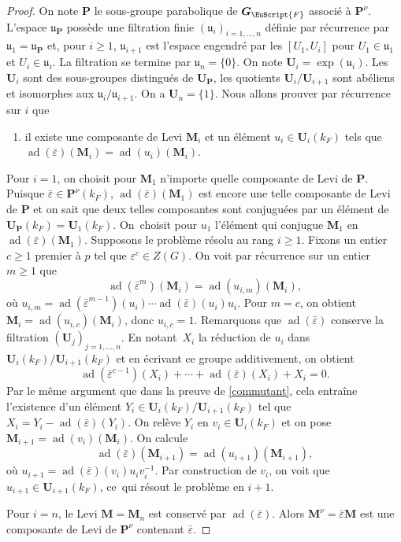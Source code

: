 \documentclass[JEP,XML,SOM,Unicode,francais]{cedram}
\let\mathcal \EuScript
\let\epsilon\varepsilon
\newcommand{\fru}{\mathfrak{u}}
\DeclareMathOperator{\ad}{ad}
\newcommand{\bG}{\boldsymbol{G}}
\newcommand{\bM}{\boldsymbol{M}}
\newcommand{\bP}{\boldsymbol{P}}
\newcommand{\bU}{\boldsymbol{U}}
\newcommand{\cF}{\mathcal{F}}
\theoremstyle{plain}
\theoremstyle{definition}
\begin{document}
\begin{proof}
On note $\bP$ le sous-groupe parabolique de $\bG_{\cF}$ associé à $\bP^{\nu}$. L'espace $\boldsymbol{\fru}_{\bP}$ possède une filtration finie $(\boldsymbol{\fru}_{i})_{i=1,\dots,n}$ définie par récurrence par $\boldsymbol{\fru}_{1}=\boldsymbol{\fru}_{\bP}$ et, pour $i\geq1$, $\boldsymbol{\fru}_{i+1}$ est l'espace engendré par les $[U_{1},U_{i}]$ pour $U_{1}\in \boldsymbol{\fru}_{1}$ et $U_{i}\in \boldsymbol{\fru}_{i}$. La filtration se termine par $\boldsymbol{\fru}_{n}=\{0\}$. On note $\bU_{i}=\exp(\boldsymbol{\fru}_{i})$. Les $\bU_{i}$ sont des sous-groupes distingués de $\bU_{\bP}$, les quotients $\bU_{i}/\bU_{i+1}$ sont abéliens et isomorphes aux $\boldsymbol{\fru}_{i}/\boldsymbol{\fru}_{i+1}$. On a $\bU_{n}=\{1\}$. Nous allons prouver par récurrence sur $i$ que
\begin{enumerate}
\item\label{p'unlemme1}
il existe une composante de Levi $\bM_{i}$ et un élément $u_{i}\in \bU_{i}(k_{F})$ tels que $\ad(\bar{\epsilon})(\bM_{i})=\ad(u_{i})(\bM_{i})$.
\end{enumerate}

Pour $i=1$, on choisit pour $\bM_{1}$ n'importe quelle composante de Levi de $\bP$. Puisque $\bar{\epsilon}\in \bP^{\nu}(k_{F})$, $\ad(\bar{\epsilon})(\bM_{1})$ est encore une telle composante de Levi de $\bP$ et on sait que deux telles composantes sont conjuguées par un élément de $\bU_{\bP}(k_{F})=\bU_{1}(k_{F})$. On~choisit pour $u_{1}$ l'élément qui conjugue $\bM_{1}$ en $\ad(\bar{\epsilon})(\bM_{1})$. Supposons le problème résolu au rang $i\geq1$.
Fixons un entier $c\geq1$ premier à $p$ tel que $\epsilon^c\in Z(G)$. On voit par récurrence sur un entier $m\geq1$ que
\[
\ad(\bar{\epsilon}^m)(\bM_{i})=\ad( u_{i,m})(\bM_{i}),
\]
où $u_{i,m}=\ad(\bar{\epsilon}^{m-1})(u_{i})\cdots\ad(\bar{\epsilon})(u_{i})u_{i}$. Pour $m=c$, on obtient $\bM_{i}=\ad(u_{i,c})(\bM_{i})$, donc $u_{i,c}=1$. Remarquons que $\ad(\bar{\epsilon})$ conserve la filtration $(\bU_{j})_{j=1,\dots,n}$. En notant~$X_{i}$ la réduction de $u_{i}$ dans $\bU_{i}(k_{F})/\bU_{i+1}(k_{F})$ et en écrivant ce groupe additivement, on obtient
\[
\ad(\bar{\epsilon}^{c-1})(X_{i})+\cdots+\ad(\bar{\epsilon})(X_{i})+X_{i}=0.
\]
Par le même argument que dans la preuve de \ref{commutant}, cela entraîne l'existence d'un élément $Y_{i}\in \bU_{i}(k_{F})/\bU_{i+1}(k_{F})$ tel que $X_{i}=Y_{i}-\ad(\bar{\epsilon})(Y_{i})$. On relève $Y_{i}$ en $v_{i}\in \bU_{i}(k_{F})$ et on pose $\bM_{i+1}=\ad(v_{i})(\bM_{i})$. On calcule
\[
\ad(\bar{\epsilon})(\bM_{i+1})=\ad(u_{i+1})(\bM_{i+1}),
\]
où $u_{i+1}=\ad(\bar{\epsilon})(v_{i})u_{i}v_{i}^{-1}$. Par construction de $v_{i}$, on voit que $u_{i+1}\in \bU_{i+1}(k_{F})$, ce~qui résout le problème en $i+1$.

Pour $i=n$, le Levi $\bM=\bM_{n}$ est conservé par $\ad(\bar{\epsilon})$. Alors $\bM^{\nu}=\bar{\epsilon}\bM$ est une composante de Levi de $\bP^{\nu}$ contenant $\bar{\epsilon}$.
\end{proof}
\end{document}
